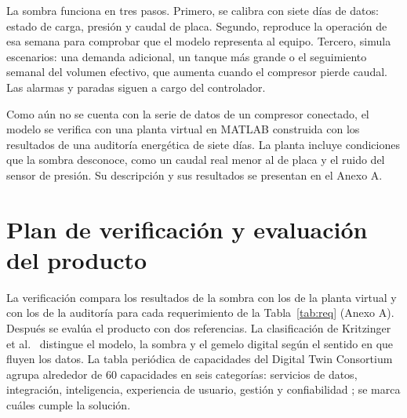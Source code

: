 La sombra funciona en tres pasos. Primero, se calibra con siete días de datos: estado de carga, presión y caudal de placa. Segundo, reproduce la operación de esa semana para comprobar que el modelo representa al equipo. Tercero, simula escenarios: una demanda adicional, un tanque más grande o el seguimiento semanal del volumen efectivo, que aumenta cuando el compresor pierde caudal. Las alarmas y paradas siguen a cargo del controlador.

Como aún no se cuenta con la serie de datos de un compresor conectado, el modelo se verifica con una planta virtual en MATLAB construida con los resultados de una auditoría energética de siete días. La planta incluye condiciones que la sombra desconoce, como un caudal real menor al de placa y el ruido del sensor de presión. Su descripción y sus resultados se presentan en el Anexo A.

\section{Plan de verificación y evaluación del producto}

La verificación compara los resultados de la sombra con los de la planta virtual y con los de la auditoría para cada requerimiento de la Tabla~\ref{tab:req} (Anexo A). Después se evalúa el producto con dos referencias. La clasificación de Kritzinger et al.~\cite{kritzinger2018} distingue el modelo, la sombra y el gemelo digital según el sentido en que fluyen los datos. La tabla periódica de capacidades del Digital Twin Consortium agrupa alrededor de 60 capacidades en seis categorías: servicios de datos, integración, inteligencia, experiencia de usuario, gestión y confiabilidad \cite{dtc_cpt}; se marca cuáles cumple la solución.
